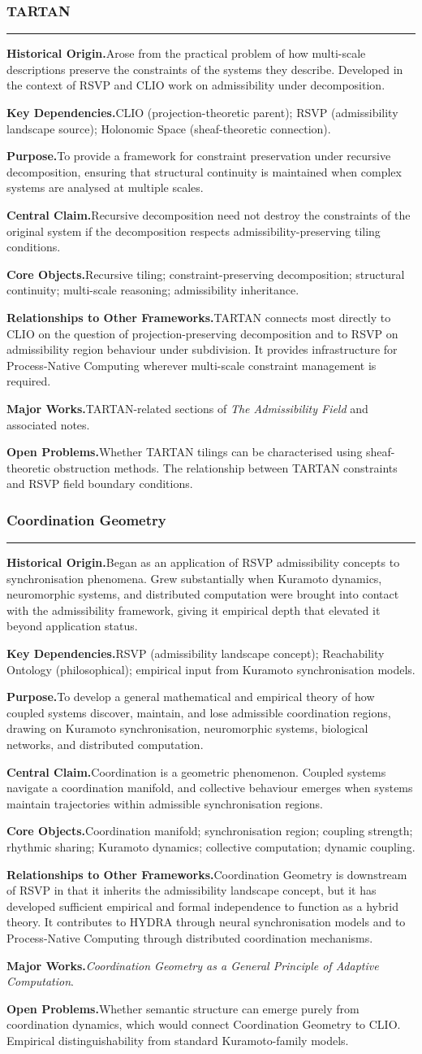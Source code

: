 \documentclass[12pt, twoside]{article}
\newcommand{\frameworkhead}[5]{  \subsubsection{#1}
  \noindent\textcolor{#2}{\rule{\linewidth}{0.8pt}}
  \smallskip

  \noindent\textbf{Historical Origin.}\quad #3

  \noindent\textbf{Key Dependencies.}\quad #4

  \noindent\textbf{Purpose.}\quad #5
}
\newcommand{\frameworkbody}[5]{  \noindent\textbf{Central Claim.}\quad #1

  \noindent\textbf{Core Objects.}\quad #2

  \noindent\textbf{Relationships to Other Frameworks.}\quad #3

  \noindent\textbf{Major Works.}\quad #4

  \noindent\textbf{Open Problems.}\quad #5
  \medskip
}
\begin{document}
\frameworkhead{TARTAN}{formalismgray}{Arose from the practical problem of how multi-scale descriptions preserve
the constraints of the systems they describe. Developed in the context of
RSVP and CLIO work on admissibility under decomposition.}{CLIO (projection-theoretic parent); RSVP (admissibility landscape source);
Holonomic Space (sheaf-theoretic connection).}{To provide a framework for constraint preservation under recursive
decomposition, ensuring that structural continuity is maintained when complex
systems are analysed at multiple scales.}
\frameworkbody{Recursive decomposition need not destroy the constraints of the original
system if the decomposition respects admissibility-preserving tiling
conditions.}{Recursive tiling; constraint-preserving decomposition; structural
continuity; multi-scale reasoning; admissibility inheritance.}{TARTAN connects most directly to CLIO on the question of
projection-preserving decomposition and to RSVP on admissibility region
behaviour under subdivision. It provides infrastructure for Process-Native
Computing wherever multi-scale constraint management is required.}{TARTAN-related sections of \emph{The Admissibility Field} and associated
notes.}{Whether TARTAN tilings can be characterised using sheaf-theoretic obstruction
methods. The relationship between TARTAN constraints and RSVP field boundary
conditions.}

\frameworkhead{Coordination Geometry}{formalismgray}{Began as an application of RSVP admissibility concepts to synchronisation
phenomena. Grew substantially when Kuramoto dynamics, neuromorphic systems,
and distributed computation were brought into contact with the admissibility
framework, giving it empirical depth that elevated it beyond application
status.}{RSVP (admissibility landscape concept); Reachability Ontology
(philosophical); empirical input from Kuramoto synchronisation models.}{To develop a general mathematical and empirical theory of how coupled systems
discover, maintain, and lose admissible coordination regions, drawing on
Kuramoto synchronisation, neuromorphic systems, biological networks, and
distributed computation.}
\frameworkbody{Coordination is a geometric phenomenon. Coupled systems navigate a
coordination manifold, and collective behaviour emerges when systems maintain
trajectories within admissible synchronisation regions.}{Coordination manifold; synchronisation region; coupling strength; rhythmic
sharing; Kuramoto dynamics; collective computation; dynamic coupling.}{Coordination Geometry is downstream of RSVP in that it inherits the
admissibility landscape concept, but it has developed sufficient empirical and
formal independence to function as a hybrid theory. It contributes to HYDRA
through neural synchronisation models and to Process-Native Computing through
distributed coordination mechanisms.}{\emph{Coordination Geometry as a General Principle of Adaptive Computation}.}{Whether semantic structure can emerge purely from coordination dynamics,
which would connect Coordination Geometry to CLIO. Empirical distinguishability
from standard Kuramoto-family models.}
\end{document}
